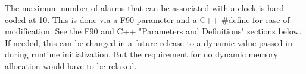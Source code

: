 
The maximum number of alarms that can be associated with a clock is hard-coded
at 10.  This is done via a F90 parameter and a C++ \#define for ease of
modification.  See the F90 and C++ "Parameters and Definitions" sections below.
If needed, this can be changed in a future release to a dynamic value passed
in during runtime initialization.  But the requirement for no dynamic memory
allocation would have to be relaxed.
